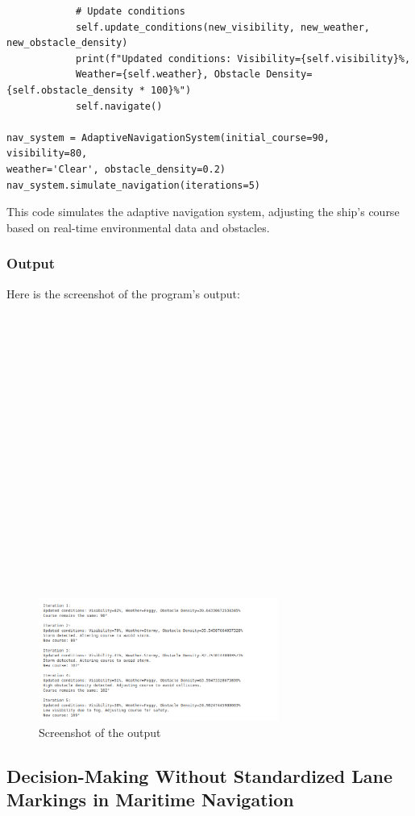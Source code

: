 \documentclass{article}
\begin{document}
\begin{verbatim}
            # Update conditions
            self.update_conditions(new_visibility, new_weather, new_obstacle_density)
            print(f"Updated conditions: Visibility={self.visibility}%, 
            Weather={self.weather}, Obstacle Density={self.obstacle_density * 100}%")
            self.navigate()

nav_system = AdaptiveNavigationSystem(initial_course=90, visibility=80,
weather='Clear', obstacle_density=0.2)
nav_system.simulate_navigation(iterations=5)
\end{verbatim}

This code simulates the adaptive navigation system, adjusting the ship's course based on real-time environmental data and obstacles.
\subsubsection{Output}
Here is the screenshot of the program's output:
\\ \\ \\ \\ \\ \\ \\ \\ \\ \\ \\ \\ \\ \\ \\ \\ \\ \\ \\
\begin{figure}[h!]
    \centering
    \includegraphics[width=0.7\textwidth]{2_b.png} 
    \caption{Screenshot of the output}
\end{figure}
\subsection{\large Decision-Making Without Standardized Lane Markings in Maritime Navigation}
\end{document}
